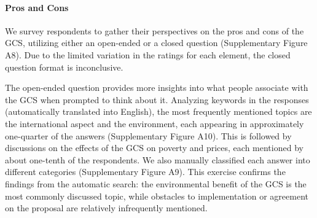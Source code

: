 \documentclass{nature}
\begin{document}
\paragraph{Pros and Cons}\label{subsubsec:pros_cons} %

We survey respondents to gather their perspectives on the pros and cons of the GCS, utilizing either an open-ended or a closed question (Supplementary Figure A8). 
Due to the limited variation in the ratings for each element, the closed question format is inconclusive. %

The open-ended question provides more insights into what people associate with the GCS when prompted to think about it. %
Analyzing keywords in the responses (automatically translated into English), the most frequently mentioned topics are the international aspect and the environment, each appearing in approximately one-quarter of the answers (Supplementary Figure A10). This is followed by discussions on the effects of the GCS on poverty and prices, each mentioned by about one-tenth of the respondents. We also manually classified each answer into different categories (Supplementary Figure A9). This exercise confirms the findings from the automatic search: the environmental benefit of the GCS is the most commonly discussed topic, while obstacles to implementation or agreement on the proposal are relatively infrequently mentioned. %
\end{document}
